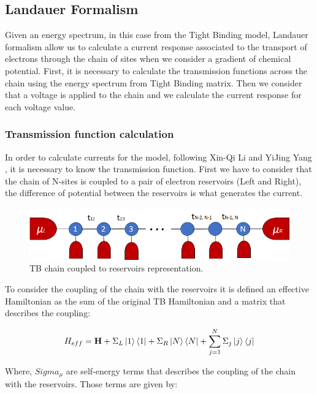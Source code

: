 \documentclass[12pt]{article}
\begin{document}
\subsection{Landauer Formalism}

Given an energy spectrum, in this case from the Tight Binding model, Landauer formalism allow us to calculate a current response associated to the transport of electrons through the chain of sites when we consider a gradient of chemical potential. First, it is necessary to calculate the transmission functions across the chain using the energy spectrum from Tight Binding matrix. Then we consider that a voltage is applied to the chain and we calculate the current response for each voltage value. 

\subsubsection{Transmission function calculation}
 In order to calculate currents for the model, following Xin-Qi Li and YiJing Yang  \cite{CORRIENTES}, it is necessary to know the transmission function. First we have to consider that the chain of N-sites is coupled to a pair of electron reservoirs (Left and Right), the difference of potential between the reservoirs is what generates the current. 

\begin{figure}[ht]
    \centering
    \includegraphics[scale=0.65]{ReservoirsCoupling.png}
    \caption{TB chain coupled to reservoirs representation.}
    \label{CoupledChain}
\end{figure}

To consider the coupling of the chain with the reservoirs it is defined an effective Hamiltonian as the sum of the original TB Hamiltonian and a matrix that describes the coupling:

\begin{equation}\label{Heff}
	H_{eff} = \textbf{H} + \Sigma_{L}\ket{1}\bra{1} + \Sigma_{R}\ket{N}\bra{N} + \sum_{j=1}^{N} \Sigma_{j}\ket{j}\bra{j}
\end{equation}

Where, $Sigma_{\mu}$ are self-energy terms that describes the coupling of the chain with the reservoirs. Those terms are given by:
\end{document}
